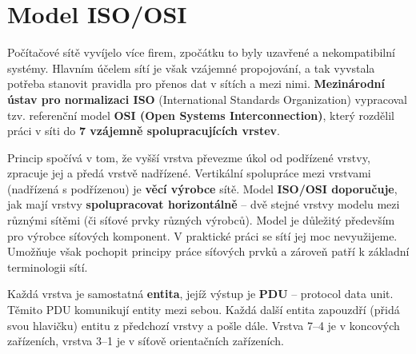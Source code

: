 \section{Model ISO/OSI}
Počítačové sítě vyvíjelo více firem, zpočátku to byly uzavřené a nekompatibilní systémy. Hlavním účelem sítí je však vzájemné propojování, a tak vyvstala potřeba stanovit pravidla pro přenos dat v sítích a mezi nimi. \textbf{Mezinárodní ústav pro normalizaci ISO} (International Standards Organization) vypracoval tzv. referenční model \textbf{OSI (Open Systems Interconnection)}, který rozdělil práci v síti do \textbf{7 vzájemně spolupracujících vrstev}.

Princip spočívá v tom, že vyšší vrstva převezme úkol od podřízené vrstvy, zpracuje jej a předá vrstvě nadřízené. Vertikální spolupráce mezi vrstvami (nadřízená s podřízenou) je \textbf{věcí výrobce} sítě. Model \textbf{ISO/OSI doporučuje}, jak mají vrstvy \textbf{spolupracovat horizontálně} – dvě stejné vrstvy modelu mezi různými sítěmi (či síťové prvky různých výrobců). Model je důležitý především pro výrobce síťových komponent. V praktické práci se sítí jej moc nevyužijeme. Umožňuje však pochopit principy práce síťových prvků a zároveň patří k základní terminologii sítí.

Každá vrstva je samostatná \textbf{entita}, jejíž výstup je \textbf{PDU} -- protocol data unit. Těmito PDU komunikují entity mezi sebou. Každá další entita zapouzdří (přidá svou hlavičku) entitu z předchozí vrstvy a pošle dále. Vrstva 7--4 je v koncových zařízeních, vrstva 3--1 je v síťově orientačních zařízeních.

